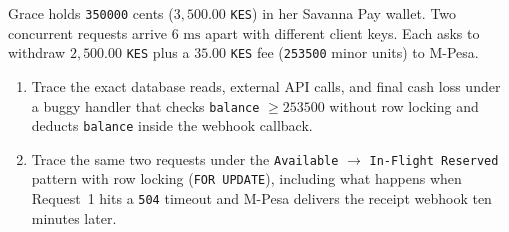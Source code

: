 \begin{exercise}
Grace holds \texttt{350000} cents ($3{,}500.00$ \texttt{KES}) in her Savanna Pay wallet. Two concurrent requests arrive $6\text{ ms}$ apart with different client keys. Each asks to withdraw $2{,}500.00$ \texttt{KES} plus a $35.00$ \texttt{KES} fee (\texttt{253500} minor units) to M-Pesa.
\begin{enumerate}
  \item Trace the exact database reads, external API calls, and final cash loss under a buggy handler that checks \texttt{balance} $\ge 253500$ without row locking and deducts \texttt{balance} inside the webhook callback.
  \item Trace the same two requests under the \texttt{Available} $\to$ \texttt{In-Flight Reserved} pattern with row locking (\texttt{FOR UPDATE}), including what happens when Request~1 hits a \texttt{504} timeout and M-Pesa delivers the receipt webhook ten minutes later.
\end{enumerate}
\end{exercise}
